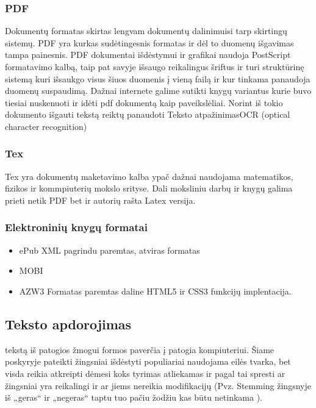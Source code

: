 \documentclass[draft]{VUMIFInfKursinis}
\begin{document}
\subsubsection{PDF}
 Dokumentų formatas skirtas lengvam dokumentų dalinimuisi tarp skirtingų sistemų. PDF yra kurkas sudėtingesnis formatas ir dėl to duomenų išgavimas tampa painesnis. PDF dokumentai išdėstymui ir grafikai naudoja PostScript formatavimo kalbą, taip pat savyje išsaugo reikalingus šriftus ir turi struktūrinę sistemą kuri išsaukgo visus šiuos duomenis į vieną failą ir kur tinkama panaudoja duomenų suspaudimą.
Dažnai internete galime sutikti knygų variantus kurie buvo tiesiai nuskenuoti ir idėti pdf dokumentą kaip paveikslėliai. Norint iš tokio dokumento išgauti tekstą reiktų panaudoti {Teksto atpažinimas}{OCR (optical character recognition)}
\subsubsection{Tex}
Tex yra dokumentų maketavimo kalba ypač dažnai naudojama matematikos, fizikos ir kommpiuterių mokslo srityse. Dali moksliniu darbų ir knygų galima prieti netik PDF bet ir autorių rašta Latex versija.
\subsubsection{Elektroninių knygų formatai}
\begin{itemize}
	\item ePub
		XML pagrindu paremtas, atviras formatas
	\item MOBI

	\item AZW3
		Formatas paremtas daline HTML5 ir CSS3 funkcijų implentacija. 
\end{itemize}

\subsection{Teksto apdorojimas}
 tekstą iš patogios žmogui formos paverčia į patogia kompiuteriui. Šiame poskyryje pateikti žingsniai išdėstyti populiariai naudojama eilės tvarka, bet visda reikia atkreipti dėmesi koks tyrimas atliekamas ir pagal tai spresti ar žingsniai yra reikalingi ir ar jiems nereikia modifikacijų (Pvz. Stemming žingsnyje iš „geras“ ir „negeras“ taptu tuo pačiu žodžiu kas būtu netinkama ).
\end{document}

